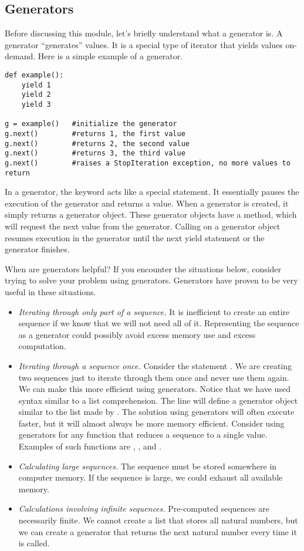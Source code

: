 \subsection*{Generators}
Before discussing this module, let's briefly understand what a generator is.
A generator ``generates'' values.  It is a special type of iterator that yields values on-demand.  Here is a simple example of a generator.
\begin{lstlisting}
def example():
    yield 1
    yield 2
    yield 3
    
g = example()   #initialize the generator
g.next()        #returns 1, the first value
g.next()        #returns 2, the second value
g.next()        #returns 3, the third value
g.next()        #raises a StopIteration exception, no more values to return
\end{lstlisting}
In a generator, the  keyword acts like a special  statement.  
It essentially pauses the execution of the generator and returns a value.
When a generator is created, it simply returns a generator object.
These generator objects have a  method, which will request the next value from the generator.
Calling  on a generator object resumes execution in the generator until the next yield statement or the generator finishes.

When are generators helpful? 
If you encounter the situations below, consider trying to solve 
your problem using generators.
Generators have proven to be very useful in these situations.
\begin{itemize}
\item \emph{Iterating through only part of a sequence.}
It is inefficient to create an entire sequence if we know that we will not need all of it.
Representing the sequence as a generator could possibly avoid excess memory use and excess computation.
\item \emph{Iterating through a sequence once.} Consider the statement 
.
We are creating two sequences just to iterate through them once and never use them again.
We can make this more efficient using generators.
Notice that we have used syntax similar to a list comprehension.
The line  will define a generator object similar to the list made by \li{[i for i in xrange(1000) if i\%2 == 0]}.
The solution using generators will often execute faster, but it will almost always be more memory efficient.  Consider using generators for any function that reduces a sequence to a single value.  Examples of such functions are , , and .
\item \emph{Calculating large sequences.}  The sequence must be stored somewhere in computer memory.
If the sequence is large, we could exhaust all available memory.
\item \emph{Calculations involving infinite sequences.}  Pre-computed sequences are necessarily finite.  We cannot create a list that stores all natural numbers, but we can create a generator that returns the next natural number every time it is called.
\end{itemize}

